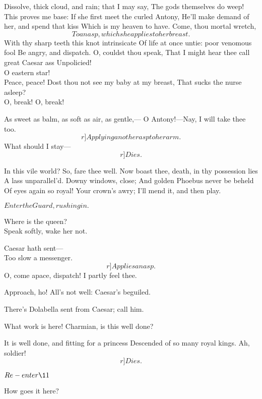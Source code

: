 \documentclass{book}
\begin{document}
\7	Dissolve, thick cloud, and rain; that I may say,
	The gods themselves do weep! \\

\2	This proves me base:
	If she first meet the curled Antony,
	He'll make demand of her, and spend that kiss
	Which is my heaven to have. Come, thou mortal wretch,
	\[To an asp, which she applies to her breast.\] %
        With thy sharp teeth this knot intrinsicate
	Of life at once untie: poor venomous fool
	Be angry, and dispatch. O, couldst thou speak,
	That I might hear thee call great Caesar ass
	Unpolicied! \\

\7	          O eastern star! \\

\2	Peace, peace!
	Dost thou not see my baby at my breast,
	That sucks the nurse asleep? \\

\7	O, break! O, break!

\2	As sweet as balm, as soft as air, as gentle,---
	O Antony!---Nay, I will take thee too.
	\[r]Applying another asp to her arm.\]
	What should I stay---  \[r]Dies.\]

\7	In this vile world? So, fare thee well.
	Now boast thee, death, in thy possession lies
	A lass unparallel'd. Downy windows, close;
	And golden Phoebus never be beheld
	Of eyes again so royal! Your crown's awry;
	I'll mend it, and then play.

	\(Enter the Guard, rushing in.\)

	Where is the queen? \\

\7	Speak softly, wake her not.

	Caesar hath sent--- \\

\7	                  Too slow a messenger.
	\[r]Applies an asp.\]
	O, come apace, dispatch! I partly feel thee.

	Approach, ho! All's not well: Caesar's beguiled.

	There's Dolabella sent from Caesar; call him.

	What work is here! Charmian, is this well done?

\7	It is well done, and fitting for a princess
	Descended of so many royal kings.
	Ah, soldier! \[r]Dies.\]

	\(Re-enter \11\)

	How goes it here? \\
\end{document}
